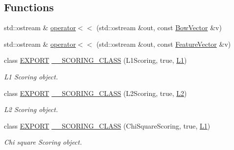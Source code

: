 \subsection*{Functions}
\begin{DoxyCompactItemize}
\item 
std\+::ostream \& \mbox{\hyperlink{namespace_d_bo_w2_a06d2058b1bde1cdc49f277fec62073e2}{operator$<$$<$}} (std\+::ostream \&out, const \mbox{\hyperlink{class_d_bo_w2_1_1_bow_vector}{Bow\+Vector}} \&v)
\item 
std\+::ostream \& \mbox{\hyperlink{namespace_d_bo_w2_ac65e2bfb945a77c5294d0300a4fed49c}{operator$<$$<$}} (std\+::ostream \&out, const \mbox{\hyperlink{class_d_bo_w2_1_1_feature_vector}{Feature\+Vector}} \&v)
\item 
class \mbox{\hyperlink{_d_bo_w2_2_d_utils_2config_8h_a3472d8cdbb788d5f1815b3522595bc49}{E\+X\+P\+O\+RT}} \mbox{\hyperlink{namespace_d_bo_w2_a366d1d4a75ab8276e171af0aaa04b29b}{\+\_\+\+\_\+\+S\+C\+O\+R\+I\+N\+G\+\_\+\+C\+L\+A\+SS}} (L1\+Scoring, true, \mbox{\hyperlink{namespace_d_bo_w2_a53e9e0bcfc25c861815e413a7cf3fa51a94f5879ff083c0a8364805ae4f9c2d5c}{L1}})
\begin{DoxyCompactList}\small\item\em L1 Scoring object. \end{DoxyCompactList}\item 
class \mbox{\hyperlink{_d_bo_w2_2_d_utils_2config_8h_a3472d8cdbb788d5f1815b3522595bc49}{E\+X\+P\+O\+RT}} \mbox{\hyperlink{namespace_d_bo_w2_a38216a543c4968d22bf2ffd2178e299c}{\+\_\+\+\_\+\+S\+C\+O\+R\+I\+N\+G\+\_\+\+C\+L\+A\+SS}} (L2\+Scoring, true, \mbox{\hyperlink{namespace_d_bo_w2_a53e9e0bcfc25c861815e413a7cf3fa51aff96c9503798aa8504a954d3832e5eaa}{L2}})
\begin{DoxyCompactList}\small\item\em L2 Scoring object. \end{DoxyCompactList}\item 
class \mbox{\hyperlink{_d_bo_w2_2_d_utils_2config_8h_a3472d8cdbb788d5f1815b3522595bc49}{E\+X\+P\+O\+RT}} \mbox{\hyperlink{namespace_d_bo_w2_adc330022cadf004b7ed5b84203287039}{\+\_\+\+\_\+\+S\+C\+O\+R\+I\+N\+G\+\_\+\+C\+L\+A\+SS}} (Chi\+Square\+Scoring, true, \mbox{\hyperlink{namespace_d_bo_w2_a53e9e0bcfc25c861815e413a7cf3fa51a94f5879ff083c0a8364805ae4f9c2d5c}{L1}})
\begin{DoxyCompactList}\small\item\em Chi square Scoring object. \end{DoxyCompactList}\item 

\end{DoxyCompactItemize}

